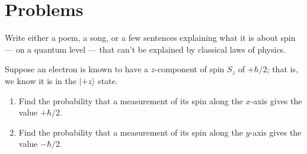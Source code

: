 %

\newpage

\section*{Problems}



\begin{problem}
Write either a poem, a song, or a few sentences explaining
what it is about spin --- on a quantum level --- that can't be
explained by classical laws of physics. \label{prob:spin_poem}
\end{problem}


\begin{problem}
Suppose an electron is known to have a $z$-component of spin $S_z$ of $+\hbar/2$; that is, we know it is in the $|\mbox{$+z$}\rangle$ state.
\begin{enumerate} 
\item   Find the probability that a measurement of
    its spin along the $x$-axis gives the value $+\hbar/2$.
\item Find the probability that a measurement of its spin along
    the $y$-axis gives the value $-\hbar/2$.
 \end{enumerate}
\label{prob:spin_i}
\end{problem}

